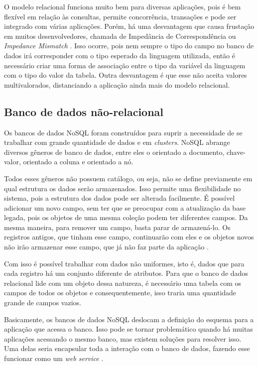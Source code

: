 O modelo relacional funciona muito bem para diversas aplicações, pois é bem flexível em relação às consultas, permite concorrência, transações e pode ser integrado com várias aplicações. Porém, há uma desvantagem que causa frustação em muitos desenvolvedores, chamada de Impedância de Correspondência ou \textit{Impedance Mismatch} \cite{Elmasri,NoSQL}. Isso ocorre, pois nem sempre o tipo do campo no banco de dados irá corresponder com o tipo esperado da linguagem utilizada, então é necessário criar uma forma de associação entre o tipo da variável da linguagem com o tipo do valor da tabela. Outra desvantagem é que esse não aceita valores multivalorados, distanciando a aplicação ainda mais do modelo relacional.


\subsection{Banco de dados não-relacional}
\label{subsec:nosqldatabasetype}
Os bancos de dados NoSQL foram construídos para suprir a necessidade de se trabalhar com grande quantidade de dados e em \textit{clusters}. NoSQL abrange diversos gêneros de banco de dados, entre eles o orientado a documento, chave-valor, orientado a coluna e orientado a nó.

Todos esses gêneros não possuem catálogo, ou seja, não se define previamente em qual estrutura os dados serão armazenados. Isso permite uma flexibilidade no sistema, pois a estrutura dos dados pode ser alterada facilmente. É possível adicionar um novo campo, sem ter que se preocupar com a atualização da base legada, pois os objetos de uma mesma coleção podem ter diferentes campos. Da mesma maneira, para remover um campo, basta parar de armazená-lo. Os registros antigos, que tinham esse campo, continuarão com eles e os objetos novos não irão armazenar esse campo, que já não faz parte da aplicação \cite{NoSQL}.

Com isso é possível trabalhar com dados não uniformes, isto é, dados que para cada registro há um conjunto diferente de atributos. Para que o banco de dados relacional lide com um objeto dessa natureza, é necessário uma tabela com os campos de todos os objetos e consequentemente, isso traria uma quantidade grande de campos vazios.

Basicamente, os bancos de dados NoSQL deslocam a definição do esquema para a aplicação que acessa o banco. Isso pode se tornar problemático quando há muitas aplicações acessando o mesmo banco, mas existem soluções para resolver isso. Uma delas seria encapsular toda a interação com o banco de dados, fazendo esse funcionar como um \textit{web service} \cite{NoSQL}.


